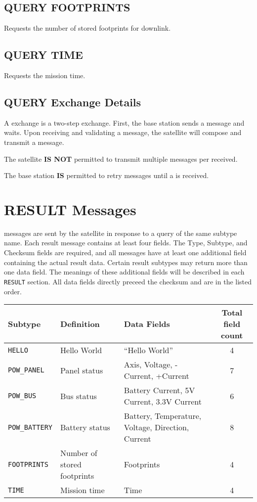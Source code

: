\documentclass{article}
\begin{document}
  \subsection{QUERY FOOTPRINTS}
    Requests the number of stored footprints for downlink.
    
  \subsection{QUERY TIME}
    Requests the mission time.
  
  \subsection{QUERY Exchange Details}
  A \mquery exchange is a two-step exchange. First, the base station sends a \mquery message and waits.
  Upon receiving and validating a \mquery message, the satellite will compose and transmit a \mresult message.
  
  The satellite \textbf{IS NOT} permitted to transmit multiple \mresult
   messages per \mquery received.
  
  The base station \textbf{IS} permitted to retry \mquery messages until a \mresult is received.
  
 

\section{RESULT Messages}
  \mresult messages are sent by the satellite in response to a query of the same subtype name. Each result message contains at least four fields.
  The Type, Subtype, and Checksum fields are required, and all \mresult messages have at least one additional field containing the actual result
  data. Certain result subtypes may return more than one data field. The meanings of these additional
  fields will be described in each \texttt{RESULT} section. All data fields directly preceed the checksum and are in the listed order.
  
  \begin{center}
    \begin{tabular}{| l | l | l | c |}
      \hline
      Subtype & Definition & Data Fields & Total field count \\ \hline
      \texttt{HELLO} & Hello World & ``Hello World'' & 4\\
      \texttt{POW\_PANEL} & Panel status & Axis, Voltage, -Current, +Current & 7\\
      \texttt{POW\_BUS} & Bus status & Battery Current, 5V Current, 3.3V Current & 6 \\
      \texttt{POW\_BATTERY} & Battery status & Battery, Temperature, Voltage, Direction, Current & 8 \\
      \texttt{FOOTPRINTS} & Number of stored footprints & Footprints & 4\\
      \texttt{TIME} & Mission time & Time & 4\\
      \hline
    \end{tabular}
  \end{center}
  
\end{document}
